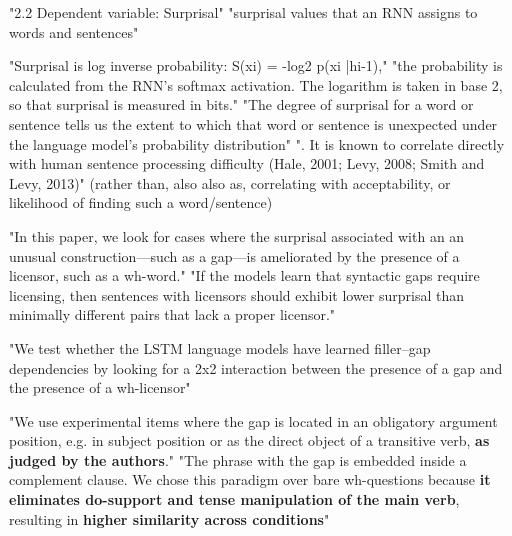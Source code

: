 "2.2 Dependent variable: Surprisal" \citep{wilcox2018rnn}
"surprisal values that an RNN assigns to words and sentences" \citep{wilcox2018rnn}

"Surprisal is log inverse probability:
S(xi) = -log2
p(xi
|hi-1)," \citep{wilcox2018rnn}
"the probability is calculated from the RNN’s softmax activation. The logarithm is taken in base 2,
so that surprisal is measured in bits." \citep{wilcox2018rnn}
"The degree of surprisal for a word or sentence
tells us the extent to which that word or sentence
is unexpected under the language model’s probability distribution"
". It is known to correlate directly with human sentence processing difficulty (Hale, 2001; Levy, 2008; Smith and Levy, 2013)" \citep{wilcox2018rnn}
(rather than, also also as, correlating with acceptability, or likelihood of finding such a word/sentence)

"In this paper, we look for cases where the surprisal associated with an an unusual construction—such as a gap—is ameliorated by the presence of a licensor, such as a wh-word." \citep{wilcox2018rnn}
"If the models learn that syntactic gaps require licensing, then sentences with licensors should exhibit lower surprisal than minimally different pairs that lack a proper licensor." \citep{wilcox2018rnn}

"We test whether the LSTM language models have
learned filler–gap dependencies by looking for a
2x2 interaction between the presence of a gap and
the presence of a wh-licensor"

"We use experimental items where the gap is located in an obligatory argument position, e.g. in subject position or as the direct object of a transitive verb, \textbf{as judged by the authors}." \citep{wilcox2018rnn}
"The phrase with the gap is embedded inside a complement clause.  We chose this paradigm over bare wh-questions because \textbf{it eliminates do-support and tense manipulation of the main verb}, resulting in \textbf{higher similarity across conditions}" \citep{wilcox2018rnn}


